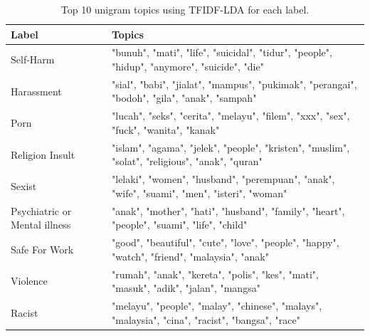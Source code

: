 \documentclass[preprint]{article}
\begin{document}
\begin{table}[h]
  \centering
  \begin{tabularx}{\textwidth}{|X|X|}
    \hline
    \textbf{Label}                & \textbf{Topics}                                                                                  \\
    \hline
    Self-Harm                     & "bunuh", "mati", "life", "suicidal", "tidur", "people", "hidup", "anymore", "suicide", "die"     \\
    Harassment                    & "sial", "babi", "jialat", "mampus", "pukimak", "perangai", "bodoh", "gila", "anak", "sampah"     \\
    Porn                          & "lucah", "seks", "cerita", "melayu", "filem", "xxx", "sex", "fuck", "wanita", "kanak"            \\
    Religion Insult               & "islam", "agama", "jelek", "people", "kristen", "muslim", "solat", "religious", "anak", "quran"  \\
    Sexist                        & "lelaki", "women", "husband", "perempuan", "anak", "wife", "suami", "men", "isteri", "woman"     \\
    Psychiatric or Mental illness & "anak", "mother", "hati", "husband", "family", "heart", "people", "suami", "life", "child"       \\
    Safe For Work                 & "good", "beautiful", "cute", "love", "people", "happy", "watch", "friend", "malaysia", "anak"    \\
    Violence                      & "rumah", "anak", "kereta", "polis", "kes", "mati", "masuk", "adik", "jalan", "mangsa"            \\
    Racist                        & "melayu", "people", "malay", "chinese", "malays", "malaysia", "cina", "racist", "bangsa", "race" \\
    \hline
  \end{tabularx}
  \caption{Top 10 unigram topics using TFIDF-LDA for each label.}
  \label{table:unigram-topics}
\end{table}

\newpage
\end{document}
